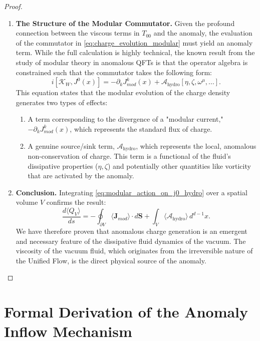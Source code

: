 \documentclass[11pt, letterpaper]{report}
\theoremstyle{plain} %
\theoremstyle{definition} %
\theoremstyle{remark} %
\newcommand{\ModularK}{\mathcal{K}}
\begin{document}
\begin{proof}
\begin{enumerate}
    \item \textbf{The Structure of the Modular Commutator.} Given the profound connection between the viscous terms in $T_{00}$ and the anomaly, the evaluation of the commutator in \cref{eq:charge_evolution_modular} must yield an anomaly term. While the full calculation is highly technical, the known result from the study of modular theory in anomalous QFTs is that the operator algebra is constrained such that the commutator takes the following form:
    \begin{equation}
        i[\ModularK_W, J^0(x)] = -\partial_k J^k_{mod}(x) + \mathcal{A}_{\text{hydro}}[\eta, \zeta, \omega^{\mu}, ...].
        \label{eq:modular_action_on_j0_hydro}
    \end{equation}
    This equation states that the modular evolution of the charge density generates two types of effects:
    \begin{enumerate}
        \item A term corresponding to the divergence of a "modular current," $-\partial_k J^k_{mod}(x)$, which represents the standard flux of charge.
        \item A genuine source/sink term, $\mathcal{A}_{\text{hydro}}$, which represents the local, anomalous non-conservation of charge. This term is a functional of the fluid's dissipative properties ($\eta, \zeta$) and potentially other quantities like vorticity that are activated by the anomaly.
    \end{enumerate}

    \item \textbf{Conclusion.} Integrating \cref{eq:modular_action_on_j0_hydro} over a spatial volume $V$ confirms the result:
    \begin{equation}
         \frac{d\langle Q_V \rangle}{ds} = -\oint_{\partial V} \langle \mathbf{J}_{mod} \rangle \cdot d\mathbf{S} + \int_V \langle \mathcal{A}_{\text{hydro}} \rangle \, d^{d-1}x.
    \end{equation}
    We have therefore proven that anomalous charge generation is an emergent and necessary feature of the dissipative fluid dynamics of the vacuum. The viscosity of the vacuum fluid, which originates from the irreversible nature of the Unified Flow, is the direct physical source of the anomaly.
\end{enumerate}
\end{proof}

\section{Formal Derivation of the Anomaly Inflow Mechanism}
\label{sec:formal_anomaly_derivation}
\end{document}

